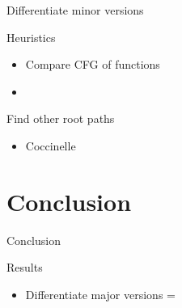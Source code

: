 \documentclass[11pt]{beamer}
\begin{document}
\begin{frame}{Differentiate minor versions}

\begin{block}{Heuristics}
	\begin{itemize}
		\item Compare CFG of functions
		\item 
	\end{itemize}
\end{block}

\end{frame}


\begin{frame}{Find other root paths}
\begin{itemize}
	\item Coccinelle
\end{itemize}
\end{frame}

\section{Conclusion}
\begin{frame}{Conclusion}
	\begin{block}{Results}
		\begin{itemize}
			\item Differentiate major versions =
		\end{itemize}
		
	\end{block}
\end{frame}
\end{document}
